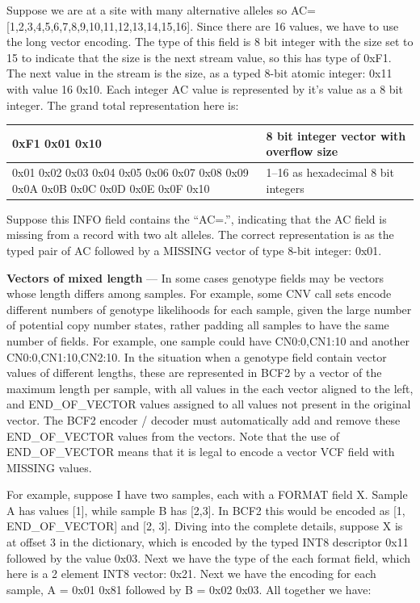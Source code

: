 \documentclass[8pt]{article}
\begin{document}
Suppose we are at a site with many alternative alleles so AC=[1,2,3,4,5,6,7,8,9,10,11,12,13,14,15,16].
Since there are 16 values, we have to use the long vector encoding.
The type of this field is 8 bit integer with the size set to 15 to indicate that the size is the next stream value, so this has type of 0xF1.
The next value in the stream is the size, as a typed 8-bit atomic integer: 0x11 with value 16 0x10.
Each integer AC value is represented by it's value as a 8 bit integer.
The grand total representation here is:

\vspace{0.3cm}
\begin{tabular}{|p{9cm} | p{6cm}|} \hline
0xF1 0x01 0x10 & 8 bit integer vector with overflow size \\ \hline
0x01 0x02 0x03 0x04 0x05 0x06 0x07 0x08 0x09 0x0A 0x0B 0x0C 0x0D 0x0E 0x0F 0x10 & 1--16 as hexadecimal 8 bit integers \\ \hline
\end{tabular}
\vspace{0.3cm}

Suppose this INFO field contains the ``AC=.'', indicating that the AC field is missing from a record with two alt alleles.
The correct representation is as the typed pair of AC followed by a MISSING vector of type 8-bit integer: 0x01.

\vspace{0.3cm}
\textbf{Vectors of mixed length} --- In some cases genotype fields may be vectors whose length differs among samples.
For example, some CNV call sets encode different numbers of genotype likelihoods for each sample, given the large number of potential copy number states, rather padding all samples to have the same number of fields.
For example, one sample could have CN0:0,CN1:10 and another CN0:0,CN1:10,CN2:10.
In the situation when a genotype field contain vector values of different lengths, these are represented in BCF2 by a vector of the maximum length per sample, with all values in the each vector aligned to the left, and END\_OF\_VECTOR values assigned to all values not present in the original vector.
The BCF2 encoder / decoder must automatically add and remove these END\_OF\_VECTOR values from the vectors. Note that the use of END\_OF\_VECTOR means that it is legal to encode a vector VCF field with MISSING values.

For example, suppose I have two samples, each with a FORMAT field X.
Sample A has values [1], while sample B has [2,3].
In BCF2 this would be encoded as [1, END\_OF\_VECTOR] and [2, 3].
Diving into the complete details, suppose X is at offset 3 in the dictionary, which is encoded by the typed INT8 descriptor 0x11 followed by the value 0x03.
Next we have the type of the each format field, which here is a 2 element INT8 vector: 0x21.
Next we have the encoding for each sample, A = 0x01 0x81 followed by B = 0x02 0x03.
All together we have:
\end{document}
